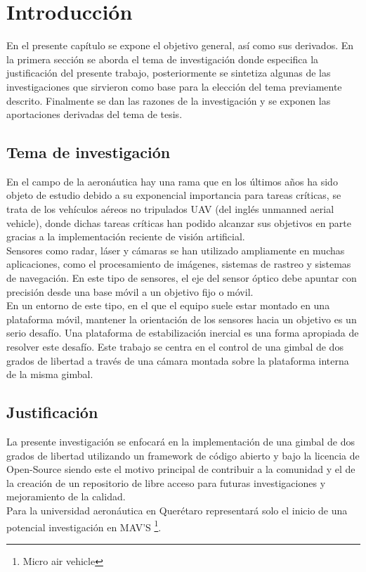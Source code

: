 %

\chapter{Introducción}
\label{sec:intro}



En el presente capítulo se expone el objetivo general, así como sus derivados. En la
primera sección se aborda el tema de investigación donde especifica la justificación del
presente trabajo, posteriormente se sintetiza algunas de las investigaciones que sirvieron
como base para la elección del tema previamente descrito. Finalmente se dan las razones
de la investigación y se exponen las aportaciones derivadas del tema de tesis.

\section{Tema de investigación}
En el campo de la aeronáutica hay una rama que en los últimos años ha sido objeto
de estudio debido a su exponencial importancia para tareas críticas, se trata de los
vehículos aéreos no tripulados UAV (del inglés unmanned aerial vehicle), donde dichas
tareas críticas han podido alcanzar sus objetivos en parte gracias a la implementación
reciente de visión artificial.\\
Sensores como radar, láser y cámaras se han utilizado ampliamente en muchas aplicaciones, como el procesamiento de imágenes, sistemas de rastreo y sistemas de navegación.
En este tipo de sensores, el eje del sensor óptico debe apuntar con precisión desde una base móvil a un objetivo fijo o móvil.\\
En un entorno de este tipo, en el que el equipo suele estar montado en una plataforma móvil, mantener la orientación de los sensores hacia un objetivo es un serio desafío.
Una plataforma de estabilización inercial es una forma apropiada de resolver este desafío.
Este trabajo se centra en el control de una gimbal de dos grados de libertad a través de una cámara montada sobre la plataforma interna de la misma gimbal.

\section{Justificación}
La presente investigación se enfocará en la implementación de una gimbal de dos grados
de libertad utilizando un framework de código abierto y bajo la licencia de Open-Source
siendo este el motivo principal de contribuir a la comunidad y el de la creación de
un repositorio de libre acceso para futuras investigaciones y mejoramiento de la calidad.\\
Para la universidad aeronáutica en Querétaro representará solo el inicio de una potencial
investigación en MAV'S \footnote{Micro air vehicle}.

